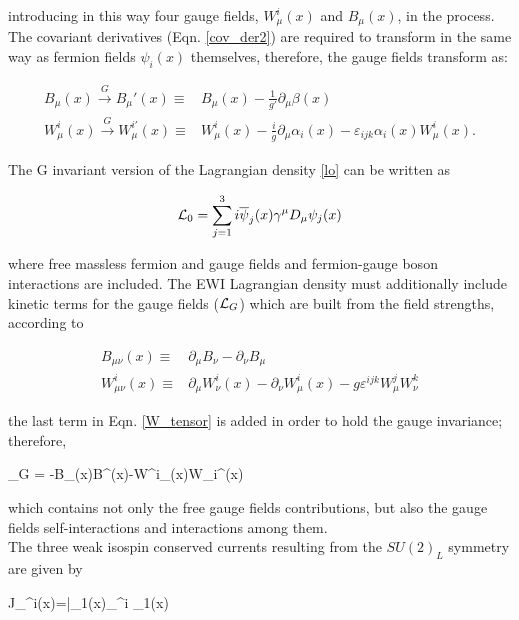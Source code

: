 \noindent introducing in this way four gauge fields, $W_\mu^i(x)$ and $B_\mu(x)$, in the process. The covariant derivatives (Eqn. \ref{cov_der2}) are required to transform in the same way as fermion fields $\psi_i(x)$ themselves, therefore, the gauge fields transform as:

\begin{align}\label{f_transf}
B_\mu(x) \xrightarrow[]{G} B_\mu'(x)\equiv & B_\mu(x)
- \frac{1}{g'}\partial_\mu\beta(x) \nonumber\\
W^i_\mu(x) \xrightarrow[]{G} W_\mu^{i\prime}(x)\equiv & W^i_\mu(x) - \frac{i}{g}\partial_\mu \alpha_i(x) - \varepsilon_{ijk}\alpha_i(x)W^i_\mu(x).
\end{align}

The G invariant version of the Lagrangian density \ref{lo} can be written as

\begin{equation}\label{linv}
\mathcal{L}_0 = \sum_{j=1}^3 i\overline{\psi}_j(x)\gamma^\mu D_\mu \psi_j(x)
\end{equation}

\noindent where free massless fermion and gauge fields and fermion-gauge boson interactions are included. The EWI Lagrangian density must additionally include kinetic terms for the gauge fields ($\mathcal{L}_G$) which are built from the field strengths, according to

\begin{align}
B_{\mu\nu}(x)   \equiv & \partial_\mu B_\nu -  \partial_\nu B_\mu \label{B_tensor} \\ 
W^i_{\mu\nu}(x) \equiv & \partial_\mu W^i_\nu(x) - \partial_\nu W^i_\mu(x) - g\varepsilon^{ijk}W^j_\mu W^k_\nu \label{W_tensor}
\end{align}

\noindent the last term in Eqn. \ref{W_tensor} is added in order to hold the gauge invariance; therefore,

\beqn\label{lg}
\Lagr_G = -B_{\mu\nu}(x)B^{\mu\nu}(x)-W^i_{\mu\nu}(x)W_i^{\mu\nu}(x)
\eeqn

\noindent which contains not only the free gauge fields contributions, but also the gauge fields self-interactions and interactions among them.\\  

The three weak isospin conserved currents resulting from the $SU(2)_L$ symmetry are given by

\beqn
J_\mu^i(x)=\bar{\psi_1}(x)\gamma_\mu \sigma^i \psi_1(x) 
\eeqn

